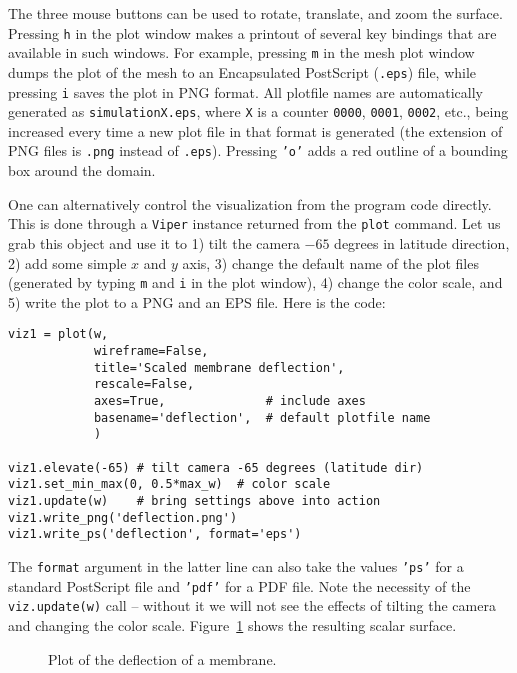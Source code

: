 The three mouse buttons can be used to rotate, translate, and zoom
the surface.
Pressing {\fontsize{12pt}{12pt}\texttt{h}} in the plot window makes a printout of several
key bindings that are available in such windows. For example,
pressing {\fontsize{12pt}{12pt}\texttt{m}} in the mesh plot window
dumps the plot of the mesh to an Encapsulated PostScript ({\fontsize{12pt}{12pt}\texttt{.eps}})
file, while pressing {\fontsize{12pt}{12pt}\texttt{i}} saves the plot in PNG format.
All plotfile names are automatically generated as {\fontsize{12pt}{12pt}\texttt{simulationX.eps}},
where {\fontsize{12pt}{12pt}\texttt{X}} is a counter {\fontsize{12pt}{12pt}\texttt{0000}}, {\fontsize{12pt}{12pt}\texttt{0001}}, {\fontsize{12pt}{12pt}\texttt{0002}}, etc.,
being increased every time a new plot file in that format
is generated (the extension
of PNG files is {\fontsize{12pt}{12pt}\texttt{.png}} instead of {\fontsize{12pt}{12pt}\texttt{.eps}}).
Pressing {\fontsize{12pt}{12pt}\texttt{'o'}} adds a red outline of a bounding box around the domain.

One can alternatively control the visualization from the program code
directly. This is done through a {\fontsize{12pt}{12pt}\texttt{Viper}} instance returned from
the {\fontsize{12pt}{12pt}\texttt{plot}} command. Let us grab this object and use it to
1) tilt the camera $-65$ degrees in latitude direction, 2) add some simple
$x$ and $y$ axis, 3) change the default name of the plot files (generated
by typing {\fontsize{12pt}{12pt}\texttt{m}} and {\fontsize{12pt}{12pt}\texttt{i}} in the plot window),
4) change the color scale, and 5) write the plot
to a PNG and an EPS file. Here is the code:
\begin{Verbatim}[fontsize=\fontsize{10pt}{10pt},tabsize=8,baselinestretch=1.05,
fontfamily=tt,xleftmargin=7mm]
viz1 = plot(w, 
            wireframe=False,
            title='Scaled membrane deflection',
            rescale=False,
            axes=True,              # include axes
            basename='deflection',  # default plotfile name
            )

viz1.elevate(-65) # tilt camera -65 degrees (latitude dir)
viz1.set_min_max(0, 0.5*max_w)  # color scale
viz1.update(w)    # bring settings above into action
viz1.write_png('deflection.png')
viz1.write_ps('deflection', format='eps')
\end{Verbatim}
\noindent
The {\fontsize{12pt}{12pt}\texttt{format}} argument in the latter line can also take the values
{\fontsize{12pt}{12pt}\texttt{'ps'}} for a standard PostScript file and {\fontsize{12pt}{12pt}\texttt{'pdf'}} for
a PDF file.
Note the necessity of the {\fontsize{12pt}{12pt}\texttt{viz.update(w)}} call -- without it we will
not see the effects of tilting the camera and changing the color scale.
Figure~\ref{langtangen:poisson:2D:fig1} shows the resulting scalar surface.
\begin{figure}
  \centerline{
   }
  \caption{\label{langtangen:poisson:2D:fig1}
  Plot of the deflection of a membrane.
  }
\end{figure}


